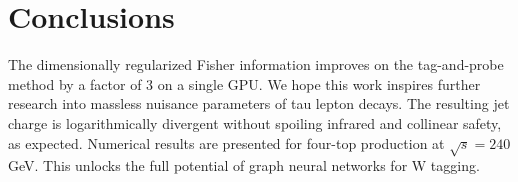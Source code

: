 \section{Conclusions}\label{sec:conclusions}

The dimensionally regularized Fisher information improves on the
tag-and-probe method by a factor of 3 on a single GPU. We hope this work
inspires further research into massless nuisance parameters of tau
lepton decays. The resulting jet charge is logarithmically divergent
without spoiling infrared and collinear safety, as expected. Numerical
results are presented for four-top production at $\sqrt{s} = 240$ GeV.
This unlocks the full potential of graph neural networks for W tagging.

